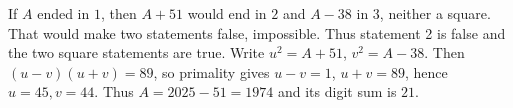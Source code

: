 If $A$ ended in $1$, then $A+51$ would end in $2$ and $A-38$ in $3$, neither a square. That would make two statements false, impossible. Thus statement 2 is false and the two square statements are true. Write $u^2=A+51$, $v^2=A-38$. Then $(u-v)(u+v)=89$, so primality gives $u-v=1$, $u+v=89$, hence $u=45,v=44$. Thus $A=2025-51=1974$ and its digit sum is $\boxed{21}$.
